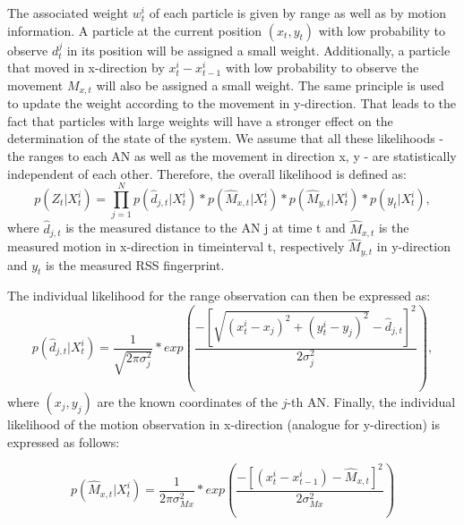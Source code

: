 The associated weight $w^{i}_{t}$ of each particle is given by range as well as by motion information. A particle at the current position $(x_{t},y_{t})$ with low probability to observe $d_{t}^{j}$ in its position will be assigned a small weight. Additionally, a particle that moved in x-direction by $x_{t}^{i}-x_{t-1}^{i}$ with low probability to observe the movement $M_{x,t}$ will also be assigned a small weight. The same principle is used to update the weight according to the movement in y-direction.
That leads to the fact that particles with large weights will have a stronger effect on the determination of the state of the system.
We assume that all these likelihoods - the ranges to each AN as well as the movement in direction x, y - are statistically independent of each other. Therefore, the overall likelihood is defined as:
\begin{equation}
p(Z_{t} | X^{i}_{t}) = \prod_{j=1}^{N} p(\hat{d}_{j,t}|X_{t}^{i}) * p(\hat{M}_{x,t} | X^{i}_{t}) * p(\hat{M}_{y,t} | X^{i}_{t}) * p(y_t | X^{i}_{t}),
\label{eqn:probability_overall}
\end{equation}
where $\hat{d}_{j,t}$ is the measured distance to the AN j at time t and $\hat{M}_{x,t}$ is the measured motion in x-direction in timeinterval t, respectively $\hat{M}_{y,t}$ in y-direction and $y_t$ is the measured RSS fingerprint.

The individual likelihood for the range observation can then be expressed as:
\begin{equation}
p(\hat{d}_{j,t} | X^{i}_{t}) = \frac{1}{\sqrt{2\pi \sigma_{j}^{2}}} * exp(\frac{-[\sqrt{(x^{i}_{t}-x_{j})^{2}+(y^{i}_{t}-y_{j})^{2}} - \hat{d}_{j,t}]^{2}}{2\sigma_{j}^{2}}),
\label{eqn:probability_individual_distance}
\end{equation}
where $(x_{j},y_{j})$ are the known coordinates of the $j$-th AN.
Finally, the individual likelihood of the motion observation in x-direction (analogue for y-direction) is expressed as follows:

\begin{equation}
p(\hat{M}_{x,t} | X^{i}_{t}) = \frac{1}{2\pi \sigma_{Mx}^{2}} * exp(\frac{-[(x^{i}_{t}-x^{i}_{t-1}) - \hat{M}_{x,t}]^{2}}{2\sigma_{Mx}^{2}})
\label{eqn:probability_individual_movement}
\end{equation}

